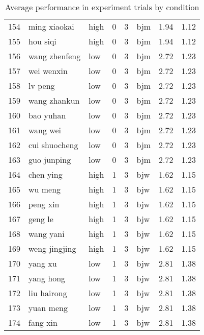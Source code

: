 \begin{table}[ht]
\begin{tabular}{rllrrlrr}
  154 & ming xiaokai & high &   0 &   3 & bjm & 1.94 & 1.12 \\ 
  155 & hou siqi & high &   0 &   3 & bjm & 1.94 & 1.12 \\ 
  156 & wang zhenfeng & low &   0 &   3 & bjm & 2.72 & 1.23 \\ 
  157 & wei wenxin & low &   0 &   3 & bjm & 2.72 & 1.23 \\ 
  158 & lv peng & low &   0 &   3 & bjm & 2.72 & 1.23 \\ 
  159 & wang zhankun & low &   0 &   3 & bjm & 2.72 & 1.23 \\ 
  160 & bao yuhan & low &   0 &   3 & bjm & 2.72 & 1.23 \\ 
  161 & wang wei & low &   0 &   3 & bjm & 2.72 & 1.23 \\ 
  162 & cui shuocheng & low &   0 &   3 & bjm & 2.72 & 1.23 \\ 
  163 & guo junping & low &   0 &   3 & bjm & 2.72 & 1.23 \\ 
  164 & chen ying & high &   1 &   3 & bjw & 1.62 & 1.15 \\ 
  165 & wu meng & high &   1 &   3 & bjw & 1.62 & 1.15 \\ 
  166 & peng xin & high &   1 &   3 & bjw & 1.62 & 1.15 \\ 
  167 & geng le & high &   1 &   3 & bjw & 1.62 & 1.15 \\ 
  168 & wang yani & high &   1 &   3 & bjw & 1.62 & 1.15 \\ 
  169 & weng jingjing & high &   1 &   3 & bjw & 1.62 & 1.15 \\ 
  170 & yang xu & low &   1 &   3 & bjw & 2.81 & 1.38 \\ 
  171 & yang hong & low &   1 &   3 & bjw & 2.81 & 1.38 \\ 
  172 & liu hairong & low &   1 &   3 & bjw & 2.81 & 1.38 \\ 
  173 & yuan meng & low &   1 &   3 & bjw & 2.81 & 1.38 \\ 
  174 & fang xin & low &   1 &   3 & bjw & 2.81 & 1.38 \\ 
   \hline
\end{tabular}
\caption{Average performance in experiment trials by condition} 
\label{tab:objectiveOutcomeCondition}
\end{table}
